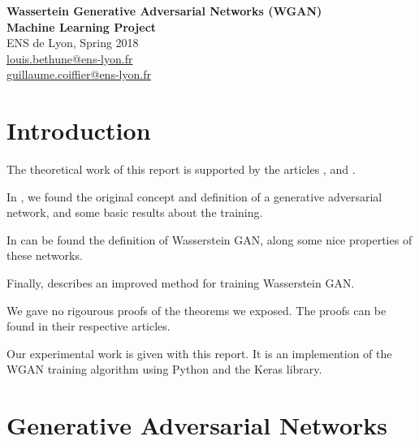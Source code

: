 \documentclass[a4paper]{report}
\theoremstyle{plain}
\theoremstyle{remark}
\theoremstyle{definition}
\begin{document}
\begin{titlepage}
\begin{center}
 {\Huge\bfseries Wassertein Generative Adversarial Networks (WGAN)\\}
 \vspace{2cm}
 {\Large \bfseries Machine Learning Project \\}
 \vspace{2cm}
 {\large ENS de Lyon, Spring 2018 \\}
 \vspace{2cm}
{\Large {} \color{black}
	\href{mailto:louis.bethune@ens-lyon.fr}{louis.bethune@ens-lyon.fr}\\
    \vspace{0.2cm}
	\href{mailto:guillaume.coiffier@ens-lyon.fr}{guillaume.coiffier@ens-lyon.fr}\\
}
\vspace{2cm}
\vfill
\end{center}
\end{titlepage}

\chapter*{Introduction}

The theoretical work of this report is supported by the articles \cite{goodfellow2014generative}, \cite{arjovsky2017wasserstein} and \cite{gulrajani2017improved}.

In \cite{goodfellow2014generative}, we found the original concept and definition of a generative adversarial network, and some basic results about the training.

In \cite{arjovsky2017wasserstein} can be found the definition of Wasserstein GAN, along some nice properties of these networks.

Finally, \cite{gulrajani2017improved} describes an improved method for training Wasserstein GAN.

We gave no rigourous proofs of the theorems we exposed. The proofs can be found in their respective articles.

Our experimental work is given with this report. It is an implemention of the WGAN training algorithm using Python and the Keras library.

\setcounter{tocdepth}{1}
\tableofcontents

\chapter{Generative Adversarial Networks}
\end{document}
